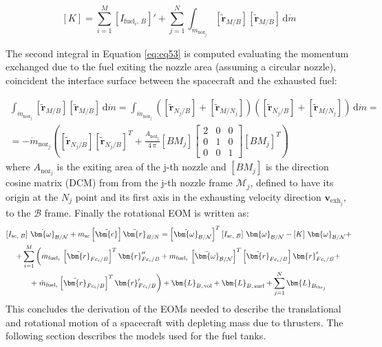 \begin{equation}\label{eq:eq53}
	\left[K\right]= \sum_{i=1}^{M}\left[I_{\text{fuel}_i,\,B}\right] '	+\sum_{j=1}^{N} \int_{\dot{m}_{\text{noz}_j}}\left[\tilde{\bm{r}}_{M/B}\right] \left[\tilde{\bm{r}}_{M/B}\right]\,\text{d}\dot{m}
\end{equation}

The second integral in Equation \eqref{eq:eq53} is computed evaluating the momentum exchanged due to the fuel exiting the nozzle area (assuming a circular nozzle), coincident the interface surface between the spacecraft and the exhausted fuel:

\begin{multline}
	\int_{\dot{m}_{\text{noz}_j}}\left[\tilde{\bm{r}}_{M/B}\right] \left[\tilde{\bm{r}}_{M/B}\right]\,\text{d}\dot{m}
	=\int_{\dot{m}_{\text{noz}_j}}\left(\left[\tilde{\bm{r}}_{N_j/B}\right] + \left[\tilde{\bm{r}}_{M/N_j}\right]\right)\left(\left[\tilde{\bm{r}}_{N_j/B}\right] + \left[\tilde{\bm{r}}_{M/N_j}\right]\right)\,\text{d}\dot{m} =\\
	=-\dot{m}_{\text{noz}_j}\left(\left[\tilde{\bm{r}}_{N_j/B}\right]\left[\tilde{\bm{r}}_{N_j/B}\right]^T + \frac{A_{\text{noz}_j}}{4\,\pi}\left[BM_j\right]\left[\begin{matrix}
		2&0&0\\
		0&1&0\\
		0&0&1
	\end{matrix}\right]\left[BM_j\right]^T\right)
\end{multline}
\noindent
where $A_{\text{noz}_j}$ is the exiting area of the j-th nozzle and $\left[BM_j\right]$ is the direction cosine matrix (DCM) from from the j-th nozzle frame $\mathcal{M}_j$, defined to have its origin at the $N_j$ point and its first axis in the exhausting velocity direction $\bm{v}_{\text{exh}_j}$, to the $\mathcal{B}$ frame.
Finally the rotational EOM is written as:
\begin{multline}\label{eq:eq55}
	\left[I_{\text{sc, }B}\right]\,\dot{\bm{\omega}}_{\cal{B}/\cal{N}} + m_{\text{sc}} \left[\tilde{\bm{c}}\right]\ddot{\bm{r}}_{B/N}= \left[\tilde{\bm{\omega}}_{\cal{B}/\cal{N}}\right]^T\left[I_{\text{sc, }B}\right]\,\bm{\omega}_{\cal{B}/\cal{N}} - \left[K\right]\,\bm{\omega} _{\mathcal{B}/\mathcal{N}}+\\+ \sum_{i=1}^{M}\left(m_{\text{fuel}_i}\,\left[\tilde{\bm{r}}_{Fc_i/B}\right]^T \bm{r}''_{Fc_i/B} +
	{m}_{\text{fuel}_i}\,
	\left[\tilde{\bm{\omega}}_{\mathcal{B}/\mathcal{N}}\right]^T \left[\tilde{\bm{r}}_{Fc_i/B}\right] \bm{r}'_{Fc_i/B}+\right.\\+\left.\dot{m}_{\text{fuel}_i} \left[\tilde{\bm{r}}_{Fc_i/B}\right]^T\bm{r}'_{Fc_i/B}\right)
	+ \bm{L}_{B,\,\text{vol}}+\bm{L}_{B,\,\text{surf}}  + \sum_{j=1}^{N}\bm{L}_{B_{\text{thr}_j}}
\end{multline}
This concludes the derivation of the EOMs needed to describe the translational and rotational motion of a spacecraft with depleting mass due to thrusters. The following section describes the models used for the fuel tanks.

